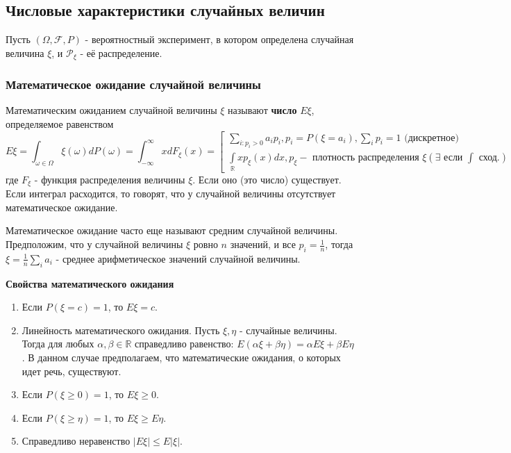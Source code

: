 \subsection{Числовые характеристики случайных величин}

Пусть $(\Omega, \mathcal{F}, P)$ - вероятностный эксперимент, в котором определена случайная величина $\xi$, и $\mathcal{P}_{\xi}$ - её распределение.

\subsubsection{Математическое ожидание случайной величины}

\begin{definition}
	Математическим ожиданием случайной величины $\xi$ называют \textbf{число} $E\xi$, определяемое равенством
	\[ E\xi = \int_{\omega \in \Omega} \xi (\omega) d P(\omega) = \int_{-\infty}^{\infty} x dF_{\xi} (x) = 
	\left[
		\begin{array}{c}
			\sum\limits_{i: p_i > 0} a_i p_i, p_i = P(\xi = a_i), \sum_{i} p_i = 1 \text{ (дискретное)} \\
			\int\limits_{\mathbb{R}} x p_{\xi} (x) dx, p_{\xi} - \text{ плотность распределения } \xi (\exists \text{ если } \int \text{ сход.})
		\end{array}
	\right.
	\]
	где $F_{\xi}$ - функция распределения величины $\xi$.
	Если оно (это число) существует. Если интеграл расходится, то говорят, что у случайной величины отсутствует математическое ожидание.
\end{definition}

\begin{remark}
	Математическое ожидание часто еще называют средним случайной величины. Предположим, что у случайной величины $\xi$ ровно $n$ значений, и все $p_i = \frac{1}{n}$, тогда $\xi = \frac{1}{n} \sum\limits_{i} a_i$ - среднее арифметическое значений случайной величины.
\end{remark}

\begin{center}
	\textbf{Свойства математического ожидания}
\end{center}
\begin{enumerate}
	\item Если $P(\xi = c) = 1$, то $E\xi = c$.
	\item Линейность математического ожидания. Пусть $\xi, \eta$ - случайные величины. Тогда для любых $\alpha, \beta \in \mathbb{R}$ справедливо равенство: $E(\alpha \xi + \beta \eta) = \alpha E \xi + \beta E \eta$. В данном случае предполагаем, что математические ожидания, о которых идет речь, существуют.
	\item Если $P(\xi \ge 0) = 1$, то $E\xi \ge 0$.
	\item Если $P(\xi \ge \eta) = 1$, то $E\xi \ge E\eta$.
	\item Справедливо неравенство $|E\xi| \le E |\xi|$.
\end{enumerate}

